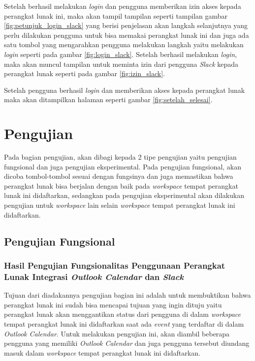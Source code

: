 Setelah berhasil melakukan \textit{login} dan pengguna memberikan izin akses kepada perangkat lunak ini, maka akan tampil tampilan seperti tampilan gambar \ref{fig:petunjuk_login_slack} yang berisi penjelasan akan langkah selanjutnya yang perlu dilakukan pengguna untuk bisa memakai perangkat lunak ini dan juga ada satu tombol yang mengarahkan pengguna melakukan langkah yaitu melakukan \textit{login} seperti pada gambar \ref{fig:login_slack}. Setelah berhasil melakukan \textit{login}, maka akan muncul tampilan untuk meminta izin dari pengguna \textit{Slack} kepada perangkat lunak seperti pada gambar \ref{fig:izin_slack}. 

Setelah pengguna berhasil \textit{login} dan memberikan akses kepada perangkat lunak maka akan ditampilkan halaman seperti gambar \ref{fig:setelah_selesai}. 

\section{Pengujian}
Pada bagian pengujian, akan dibagi kepada 2 tipe pengujian yaitu pengujian fungsional dan juga pengujian eksperimental. Pada pengujian fungsional, akan dicoba tombol-tombol sesuai dengan fungsinya dan juga memastikan bahwa perangkat lunak bisa berjalan dengan baik pada \textit{workspace} tempat perangkat lunak ini didaftarkan, sedangkan pada pengujian eksperimental akan dilakukan pengujian untuk \textit{workspace} lain selain \textit{workspace} tempat perangkat lunak ini didaftarkan. 

\subsection{Pengujian Fungsional}
\subsubsection{Hasil Pengujian Fungsionalitas Penggunaan Perangkat Lunak Integrasi \textit{Outlook Calendar} dan \textit{Slack}}
Tujuan dari diadakannya pengujian bagian ini adalah untuk membuktikan bahwa perangkat lunak ini sudah bisa mencapai tujuan yang ingin dituju yaitu perangkat lunak akan menggantikan status dari pengguna di dalam \textit{workspace} tempat perangkat lunak ini didaftarkan saat ada \textit{event} yang terdaftar di dalam \textit{Outlook Calendar}. Untuk melakukan pengujian ini, akan diambil beberapa pengguna yang memiliki \textit{Outlook Calendar} dan juga pengguna tersebut diundang masuk dalam \textit{workspace} tempat perangkat lunak ini didaftarkan.

